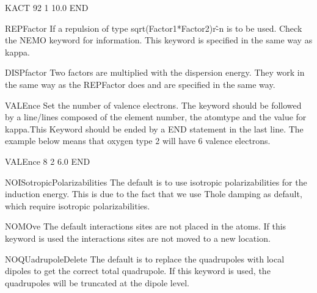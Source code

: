 \begin{keywordlist}
\begin{inputlisting}
KACT
92 1 10.0
END
\end{inputlisting}
\item[REPFactor]
If a repulsion of type sqrt(Factor1*Factor2)r\^-n is to be used.
Check the NEMO keyword for information. This keyword is specified in the same way as kappa.
\item[DISPfactor]
Two factors are multiplied with the dispersion energy. They work in the same way as the REPFactor does and
are specified in the same way.
\item[VALEnce]
Set the number of valence electrons. The keyword should be followed by a line/lines composed of the element number,
the atomtype and the value for kappa.This Keyword should be ended by a END statement
in the last line. The example below means that oxygen type 2 will have 6 valence electrons.
\begin{inputlisting}
VALEnce
8 2 6.0
END
\end{inputlisting}
\item[NOISotropicPolarizabilities]
The default is to use isotropic polarizabilities for the induction energy.
This is due to the fact that we use Thole damping as default, which require isotropic
polarizabilities.
\item[NOMOve]
The default interactions sites are not placed in the atoms. If this keyword is used
the interactions sites are not moved to a new location.
\item[NOQUadrupoleDelete]
The default is to replace the quadrupoles with local dipoles to get the correct total quadrupole.
If this keyword is used, the quadrupoles will be truncated at the dipole level.

\end{keywordlist}
